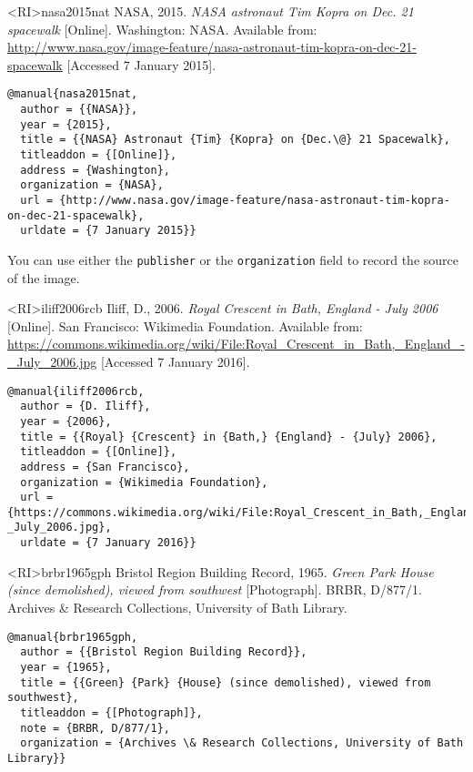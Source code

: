 \documentclass[10pt,a4paper]{article}
\newenvironment{tips}{%
  \begin{list}{\makebox[2em][c]{\faLightbulbO}}{%
    \setlength{\leftmargin}{2em}
    \setlength{\labelwidth}{2em}
    \setlength{\labelsep}{0pt}}
}{\end{list}}
\begin{document}
\begin{bibexbox}<RI>{nasa2015nat}
   NASA, 2015. \emph{NASA astronaut Tim Kopra on Dec. 21 spacewalk} [Online]. Washington: NASA. Available from: \url{http://www.nasa.gov/image-feature/nasa-astronaut-tim-kopra-on-dec-21-spacewalk} [Accessed 7 January 2015].
  \tcblower
\begin{Verbatim}
@manual{nasa2015nat,
  author = {{NASA}},
  year = {2015},
  title = {{NASA} Astronaut {Tim} {Kopra} on {Dec.\@} 21 Spacewalk},
  titleaddon = {[Online]},
  address = {Washington},
  organization = {NASA},
  url = {http://www.nasa.gov/image-feature/nasa-astronaut-tim-kopra-on-dec-21-spacewalk},
  urldate = {7 January 2015}}
\end{Verbatim}
\end{bibexbox}

\begin{tips}\item
You can use either the \texttt{publisher} or the \texttt{organization} field to
record the source of the image.
\end{tips}

\begin{bibexbox}<RI>{iliff2006rcb}
   Iliff, D., 2006. \emph{Royal Crescent in Bath, England - July 2006} [Online]. San Francisco: Wikimedia Foundation. Available from: \url{https://commons.wikimedia.org/wiki/File:Royal_Crescent_in_Bath,_England_-_July_2006.jpg} [Accessed 7 January 2016].
  \tcblower
\begin{Verbatim}
@manual{iliff2006rcb,
  author = {D. Iliff},
  year = {2006},
  title = {{Royal} {Crescent} in {Bath,} {England} - {July} 2006},
  titleaddon = {[Online]},
  address = {San Francisco},
  organization = {Wikimedia Foundation},
  url = {https://commons.wikimedia.org/wiki/File:Royal_Crescent_in_Bath,_England_-_July_2006.jpg},
  urldate = {7 January 2016}}
\end{Verbatim}
\end{bibexbox}

\begin{bibexbox}<RI>{brbr1965gph}
  Bristol Region Building Record, 1965. \emph{Green Park House (since demolished), viewed from southwest} [Photograph]. BRBR, D/877/1. Archives \& Research Collections, University of Bath Library.
  \tcblower
\begin{Verbatim}
@manual{brbr1965gph,
  author = {{Bristol Region Building Record}},
  year = {1965},
  title = {{Green} {Park} {House} (since demolished), viewed from southwest},
  titleaddon = {[Photograph]},
  note = {BRBR, D/877/1},
  organization = {Archives \& Research Collections, University of Bath Library}}
\end{Verbatim}
\end{bibexbox}
\end{document}
